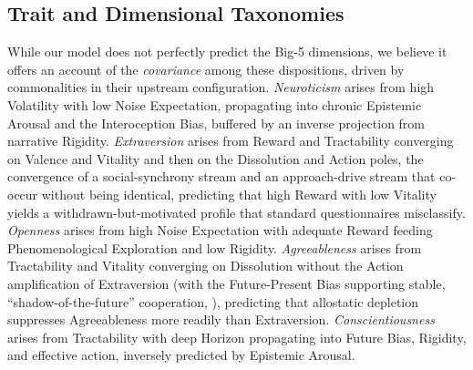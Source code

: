\documentclass[
  jou,
  floatsintext,
  longtable,
  nolmodern,
  notxfonts,
  notimes,
  12pt,
  colorlinks=true,linkcolor=blue,citecolor=blue,urlcolor=blue]{apa7}
\begin{document}
\subsection{Trait and Dimensional
Taxonomies}\label{trait-and-dimensional-taxonomies}

While our model does not perfectly predict the Big-5 dimensions, we
believe it offers an account of the \emph{covariance} among these
dispositions, driven by commonalities in their upstream configuration.
\emph{Neuroticism} arises from high Volatility with low Noise
Expectation, propagating into chronic Epistemic Arousal and the
Interoception Bias, buffered by an inverse projection from narrative
Rigidity. \emph{Extraversion} arises from Reward and Tractability
converging on Valence and Vitality and then on the Dissolution and
Action poles, the convergence of a social-synchrony stream and an
approach-drive stream that co-occur without being identical, predicting
that high Reward with low Vitality yields a withdrawn-but-motivated
profile that standard questionnaires misclassify. \emph{Openness} arises
from high Noise Expectation with adequate Reward feeding
Phenomenological Exploration and low Rigidity. \emph{Agreeableness}
arises from Tractability and Vitality converging on Dissolution without
the Action amplification of Extraversion (with the Future-Present Bias
supporting stable, ``shadow-of-the-future'' cooperation,
), predicting that allostatic
depletion suppresses Agreeableness more readily than Extraversion.
\emph{Conscientiousness} arises from Tractability with deep Horizon
propagating into Future Bias, Rigidity, and effective action, inversely
predicted by Epistemic Arousal.
\end{document}
